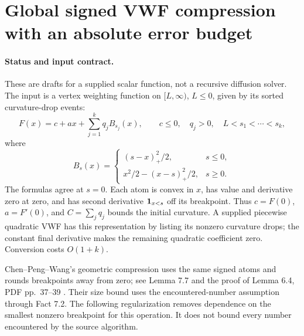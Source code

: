 \section[Global VWF compression]{Global signed VWF compression with an absolute error budget}
\label{sec:op3-global-vwf-compression}

\paragraph{Status and input contract.}
These are \statusproved{} drafts for a supplied scalar function, not a
recursive diffusion solver. The input is a vertex weighting function on
$[L,\infty)$, $L\leq0$, given by its sorted curvature-drop events:
\begin{equation}
 F(x)=c+ax+\sum_{j=1}^k q_j B_{s_j}(x),\qquad
 c\leq0,\quad q_j>0,\quad L<s_1<\cdots<s_k,
 \label{eq:op3-vwf-atoms}
\end{equation}
where
\[
 B_s(x)=
 \begin{cases}
  (s-x)_+^2/2,&s\leq0,\\
  x^2/2-(x-s)_+^2/2,&s\geq0.
 \end{cases}
\]
The formulas agree at $s=0$. Each atom is convex in $x$, has value and
derivative zero at zero, and has second derivative $\mathbf{1}_{x<s}$ off its
breakpoint. Thus $c=F(0)$, $a=F'(0)$, and $C=\sum_jq_j$ bounds the initial
curvature. A supplied piecewise quadratic VWF has this representation by
listing its nonzero curvature drops; the constant final derivative makes
the remaining quadratic coefficient zero. Conversion costs $O(1+k)$.

Chen--Peng--Wang's geometric compression uses the same signed atoms and
rounds breakpoints away from zero; see Lemma 7.7 and the proof of Lemma 6.4,
PDF pp.\ 37--39 \citep{chen2021diffusion}. Their size bound uses the
encountered-number assumption through Fact 7.2. The following regularization
removes dependence on the smallest nonzero breakpoint for this operation.
It does not bound every number encountered by the source algorithm.

